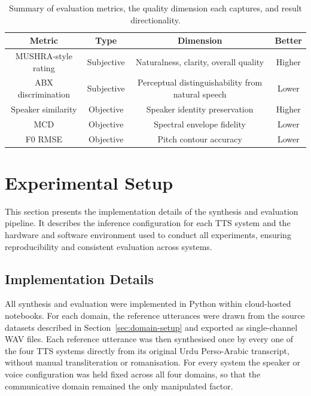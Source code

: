 \documentclass[a4paper,fleqn]{cas-dc}
\begin{document}
    
    \begin{table}[!htbp]
    \centering
    
    \caption{Summary of evaluation metrics, the quality dimension each
    captures, and result directionality.}\label{tbl:metrics}
    \small
    
    \normalsize
    \renewcommand{\arraystretch}{1.15}
    
    \begin{tabular*}{\textwidth}{@{\extracolsep{\fill}}cccc@{}}
    \toprule
    \textbf{Metric} & \textbf{Type} & \textbf{Dimension} & \textbf{Better} \\
    \midrule
    MUSHRA-style rating & Subjective & Naturalness, clarity, overall quality & Higher \\
    ABX discrimination & Subjective & Perceptual distinguishability from natural speech & Lower \\
    Speaker similarity & Objective & Speaker identity preservation & Higher \\
    MCD & Objective & Spectral envelope fidelity & Lower \\
    F0 RMSE & Objective & Pitch contour accuracy & Lower \\
    \bottomrule
    \end{tabular*}
    \end{table}
    
    
    
    \section{Experimental Setup}\label{sec:expsetup}

    This section presents the implementation details of the synthesis and evaluation pipeline. It describes the inference configuration for each TTS system and the hardware and software environment used to conduct all experiments, ensuring reproducibility and consistent evaluation across systems.

    \subsection{Implementation Details}\label{sec:expsetup-impl}
    
    All synthesis and evaluation were implemented in Python within cloud-hosted
    notebooks. For each domain, the reference utterances were drawn from the source
    datasets described in Section~\ref{sec:domain-setup} and exported as
    single-channel WAV files. Each reference utterance was then synthesised once by
    every one of the four TTS systems directly from its original Urdu Perso-Arabic
    transcript, without manual transliteration or romanisation. For every system the
    speaker or voice configuration was held fixed across all four domains, so that
    the communicative domain remained the only manipulated factor.
    
\end{document}

